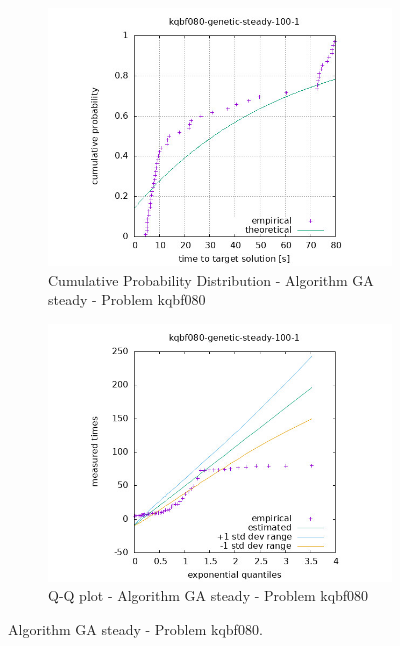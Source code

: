 \begin{figure}[H]
    \centering
    \begin{subfigure}{0.49\textwidth}
        \includegraphics[width=\textwidth]{figure/ttt_plot/kqbf080-genetic-steady-100-1-exp.jpeg}
        \caption{Cumulative Probability Distribution - Algorithm GA steady - Problem kqbf080}
        \label{fig:ga-steady-kqbf080-exp}
    \end{subfigure}
    \hfill
    \begin{subfigure}{0.49\textwidth}
        \includegraphics[width=\textwidth]{figure/ttt_plot/kqbf080-genetic-steady-100-1-qq.jpeg}
        \caption{Q-Q plot - Algorithm GA steady - Problem kqbf080}
        \label{fig:ga-steady-kqbf080-qq}
    \end{subfigure}
    \caption{Algorithm GA steady - Problem kqbf080.}
    \label{fig:ga-steady-kqbf080}
\end{figure}


